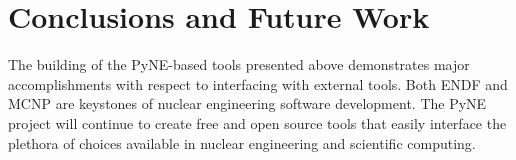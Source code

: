 \documentclass{anstrans}
\begin{document}
\section{Conclusions and Future Work}
\label{sec:conc}

The building of the PyNE-based tools presented above demonstrates major 
accomplishments with respect
to interfacing with external tools.  Both ENDF and MCNP are keystones of 
nuclear engineering software development.  The PyNE project will continue to create 
free and open source tools that easily interface the plethora of choices available 
in nuclear engineering and scientific computing. 



\end{document}
